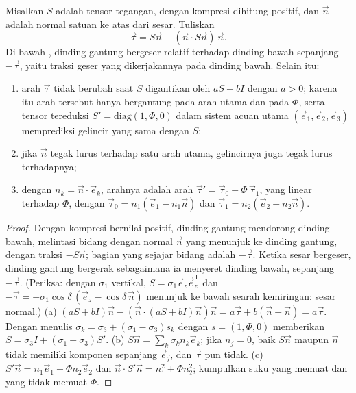 \begin{theorem}\label{thm:b3:structural-analysis:wallace-bott}
Misalkan $S$ adalah tensor tegangan, dengan kompresi dihitung positif, dan $\vec n$ adalah
normal satuan ke atas dari sesar. Tuliskan
\[
  \vec\tau = S\vec n - (\vec n\cdot S\vec n)\,\vec n .
\]
Di bawah , dinding gantung bergeser relatif terhadap
dinding bawah sepanjang $-\vec\tau$, yaitu traksi geser yang dikerjakannya pada
dinding bawah. Selain itu:
\begin{enumerate}[label=(\alph*)]
  \item arah $\vec\tau$ tidak berubah saat $S$ digantikan oleh $aS +
        bI$ dengan $a > 0$; karena itu arah tersebut hanya bergantung pada arah utama
        dan pada $\Phi$, serta tensor tereduksi $S' =
        \mathrm{diag}(1, \Phi, 0)$ dalam sistem acuan utama $(\vec e_1, \vec
        e_2, \vec e_3)$ memprediksi gelincir yang sama dengan $S$;
  \item jika $\vec n$ tegak lurus terhadap satu arah utama, gelincirnya
        juga tegak lurus terhadapnya;
  \item dengan $n_k = \vec n\cdot\vec e_k$, arahnya adalah arah $\vec\tau'
        = \vec\tau_0 + \Phi\,\vec\tau_1$, yang linear terhadap $\Phi$, dengan $\vec\tau_0
        = n_1(\vec e_1 - n_1\vec n)$ dan $\vec\tau_1 = n_2(\vec e_2 - n_2\vec
        n)$.
\end{enumerate}
\end{theorem}

\begin{proof}
Dengan kompresi bernilai positif, dinding gantung mendorong dinding bawah, melintasi
bidang dengan normal $\vec n$ yang menunjuk ke dinding gantung, dengan
traksi $-S\vec n$; bagian yang sejajar bidang adalah $-\vec\tau$. Ketika
sesar bergeser, dinding gantung bergerak sebagaimana ia menyeret dinding bawah, sepanjang
$-\vec\tau$. (Periksa: dengan $\sigma_1$ vertikal, $S = \sigma_1\vec e_z\vec
e_z^{\mathsf T}$ dan $-\vec\tau = -\sigma_1\cos\delta\,(\vec e_z -
\cos\delta\,\vec n)$ menunjuk ke bawah searah kemiringan: sesar normal.)
(a) $(aS + bI)\vec n - (\vec n\cdot(aS + bI)\vec n)\vec n = a\vec\tau + b(\vec
n - \vec n) = a\vec\tau$. Dengan menulis $\sigma_k = \sigma_3 + (\sigma_1 -
\sigma_3)s_k$ dengan $s = (1, \Phi, 0)$ memberikan $S = \sigma_3 I + (\sigma_1 -
\sigma_3)S'$.
(b) $S\vec n = \sum_k\sigma_kn_k\vec e_k$; jika $n_j = 0$, baik $S\vec n$
maupun $\vec n$ tidak memiliki komponen sepanjang $\vec e_j$, dan $\vec\tau$ pun tidak.
(c) $S'\vec n = n_1\vec e_1 + \Phi n_2\vec e_2$ dan $\vec n\cdot S'\vec n =
n_1^2 + \Phi n_2^2$; kumpulkan suku yang memuat dan yang tidak memuat $\Phi$.
\end{proof}

